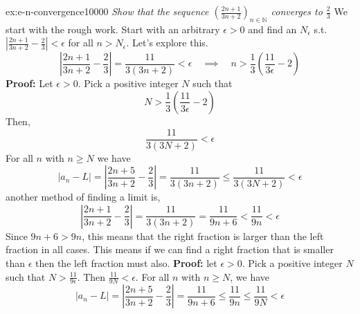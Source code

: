 \documentclass[landscape, 8pt]{extarticle}
\begin{document}
\begin{multicols}{3}
\begin{xmp}{ex:e-n-convergence}{10000}
    \textit{Show that the sequence $\left( \frac{2n+1}{3n+2} \right)_{n\in\mathbb{N}}$ converges to $\frac{2}{3}$}
    \vspace{0pt}\newline
    We start with the rough work. Start with an arbitrary $\epsilon>0$ and find an $N_{\epsilon}$ s.t. $\left\lvert  \frac{2n+1}{3n+2} -\frac{2}{3}  \right\rvert < \epsilon$ for all $n>N_{\epsilon}$. Let's explore this.
    \[\left\lvert  \frac{2n+1}{3n+2}-\frac{2}{3}  \right\rvert =\frac{11}{3(3n+2)} < \epsilon\quad\implies \quad n> \frac{1}{3}\left( \frac{11}{3\epsilon} -2\right)\]
    \textbf{Proof:} Let $\epsilon>0$. Pick a positive integer $N$ such that
    \[N>\frac{1}{3}\left( \frac{11}{3\epsilon}-2 \right)\]
    Then,
    \[\frac{11}{3(3N+2)} < \epsilon\]
    For all $n$ with $n\ge N$ we have 
    \[\lvert a_{n}-L \rvert = \left\lvert  \frac{2n+5}{3n+2} - \frac{2}{3}  \right\rvert =\frac{11}{3(3n+2)} \le \frac{11}{3(3N+2)}<\epsilon\]
    another method of finding a limit is,
    $$\left\lvert  \frac{2n+1}{3n+2}-\frac{2}{3}  \right\rvert =\frac{11}{3(3n+2)} = \frac{11}{9n+6} < \frac{11}{9n}< \epsilon$$
    Since $9n+6>9n$, this means that the right fraction is larger than the left fraction in all cases. This means if we can find a right fraction that is smaller than $\epsilon$ then the left fraction must also.
    \vspace{0pt}\newline 
    \textbf{Proof:} let $\epsilon>0$. Pick a positive integer $N$ such that $N>\frac{11}{9\epsilon}$. Then $\frac{11}{9N} < \epsilon$. For all $n$ with $n\ge N$, we have
    $$\lvert a_{n}-L \rvert = \left\lvert  \frac{2n+5}{3n+2} - \frac{2}{3}  \right\rvert =\frac{11}{9n+6} \le \frac{11}{9n} \le \frac{11}{9N}<\epsilon$$
\end{xmp}
\vspace{-5pt}


\end{multicols}
\end{document}
